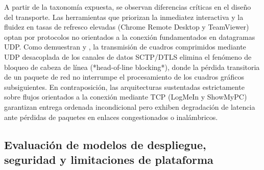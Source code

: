 \documentclass[12pt]{article}
\begin{document}
A partir de la taxonomía expuesta, se observan diferencias críticas en el diseño del transporte. Las herramientas que priorizan la inmediatez interactiva y la fluidez en tasas de refresco elevadas (Chrome Remote Desktop y TeamViewer) optan por protocolos no orientados a la conexión fundamentados en datagramas UDP. Como demuestran \textcite{rfc8825} y \textcite{teamviewerSecurityWhitepaper}, la transmisión de cuadros comprimidos mediante UDP desacoplada de los canales de datos SCTP/DTLS elimina el fenómeno de bloqueo de cabeza de línea (*head-of-line blocking*), donde la pérdida transitoria de un paquete de red no interrumpe el procesamiento de los cuadros gráficos subsiguientes. En contraposición, las arquitecturas sustentadas estrictamente sobre flujos orientados a la conexión mediante TCP (LogMeIn y ShowMyPC) garantizan entrega ordenada incondicional pero exhiben degradación de latencia ante pérdidas de paquetes en enlaces congestionados o inalámbricos.

\subsection{Evaluación de modelos de despliegue, seguridad y limitaciones de plataforma}\label{sec:evaluacionSeguridadDespliegue}
\end{document}
